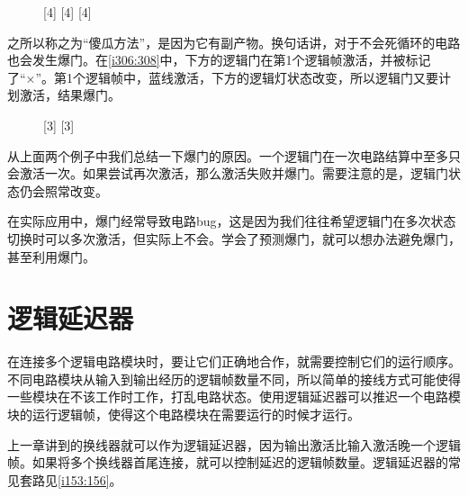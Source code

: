 \begin{figure}[!ht]
  \centering
  [4]%
  [4]%
  [4]%
  \caption{}\label{i302:305}
\end{figure}

之所以称之为“傻瓜方法”，是因为它有副产物。换句话讲，对于不会死循环的电路也会发生爆门。在\autoref{i306:308}中，下方的逻辑门在第1个逻辑帧激活，并被标记了“×”。第1个逻辑帧中，蓝线激活，下方的逻辑灯状态改变，所以逻辑门又要计划激活，结果爆门。

\begin{figure}[!ht]
  \centering
  [3]%
  [3]%
  \caption{}\label{i306:308}
\end{figure}

从上面两个例子中我们总结一下爆门的原因。一个逻辑门在一次电路结算中至多只会激活一次。如果尝试再次激活，那么激活失败并爆门。需要注意的是，逻辑门状态仍会照常改变。

在实际应用中，爆门经常导致电路bug，这是因为我们往往希望逻辑门在多次状态切换时可以多次激活，但实际上不会。学会了预测爆门，就可以想办法避免爆门，甚至利用爆门。

\section{逻辑延迟器}

在连接多个逻辑电路模块时，要让它们正确地合作，就需要控制它们的运行顺序。不同电路模块从输入到输出经历的逻辑帧数量不同，所以简单的接线方式可能使得一些模块在不该工作时工作，打乱电路状态。使用逻辑延迟器可以推迟一个电路模块的运行逻辑帧，使得这个电路模块在需要运行的时候才运行。

上一章讲到的换线器就可以作为逻辑延迟器，因为输出激活比输入激活晚一个逻辑帧。如果将多个换线器首尾连接，就可以控制延迟的逻辑帧数量。逻辑延迟器的常见套路见\autoref{i153:156}。


